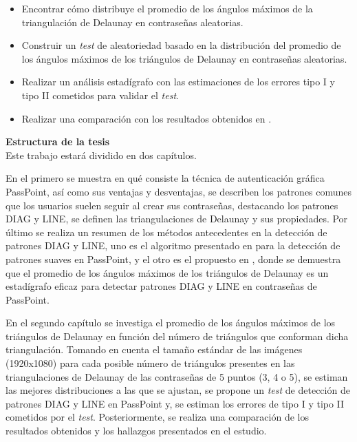 \documentclass[12pt]{report}
\begin{document}
	\begin{itemize}
		\item Encontrar cómo distribuye el promedio de los ángulos máximos de la triangulación de Delaunay en contraseñas aleatorias.
		\item Construir un \textit{test} de aleatoriedad basado en la distribución del promedio de los ángulos máximos de los triángulos de Delaunay en contraseñas aleatorias.
		
		\item Realizar un análisis estadígrafo con las estimaciones de los errores tipo I y tipo II cometidos para validar el \textit{test}.
		
		\item Realizar una comparación con los resultados obtenidos en \cite{13}.
		
	\end{itemize}
	
	
	{\large{\textbf{Estructura de la tesis}}}\\
	
	Este trabajo estará dividido en dos capítulos.
	
	En el primero se muestra en qué consiste la técnica de autenticación gráfica PassPoint, así como sus ventajas y desventajas, se describen los patrones comunes que los usuarios suelen seguir al crear sus contraseñas, destacando los patrones DIAG y LINE, se definen las triangulaciones de Delaunay y sus propiedades. Por último se realiza un resumen  de los métodos antecedentes en la detección de patrones DIAG y LINE, uno es el algoritmo presentado en \cite{3} para la detección de patrones suaves en PassPoint, y el otro es el propuesto en \cite{13}, donde se demuestra que el promedio de los ángulos máximos de los  triángulos de Delaunay es un estadígrafo eficaz para detectar patrones DIAG y LINE en contraseñas de PassPoint.
	
	En el segundo capítulo se investiga el promedio de los ángulos máximos de los triángulos de Delaunay en función del número de triángulos que conforman dicha triangulación. Tomando en cuenta el tamaño estándar de las imágenes (1920x1080) para cada posible número de triángulos presentes en las triangulaciones de Delaunay de las contraseñas de 5 puntos (3, 4 o 5), se estiman las  mejores distribuciones a las que se ajustan, se propone un \textit{test} de detección de patrones DIAG y LINE en PassPoint y, se estiman los errores de tipo I y tipo II cometidos por el \textit{test}. Posteriormente, se realiza una comparación de los resultados obtenidos y los hallazgos presentados en el estudio\cite{13}.
	
\end{document}
